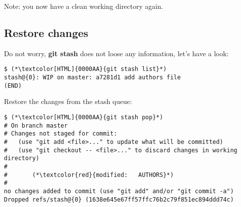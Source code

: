 Note: you now have a clean working directory again.

\subsection{Restore changes}
\begin{frame}[fragile]
\subslidetitle

Do not worry, \textbf{git stash} does not loose any information, let's have a look:

\begin{lstlisting}
$ (*\textcolor[HTML]{0000AA}{git stash list}*)
stash@{0}: WIP on master: a7281d1 add authors file
(END)
\end{lstlisting}

Restore the changes from the stash queue:

\begin{lstlisting}
$ (*\textcolor[HTML]{0000AA}{git stash pop}*)
# On branch master
# Changes not staged for commit:
#   (use "git add <file>..." to update what will be committed)
#   (use "git checkout -- <file>..." to discard changes in working directory)
#
#       (*\textcolor{red}{modified:   AUTHORS}*)
#
no changes added to commit (use "git add" and/or "git commit -a")
Dropped refs/stash@{0} (1638e645e67ff57ffc76b2c79f851ec894ddd74c)
\end{lstlisting}
\end{frame}

